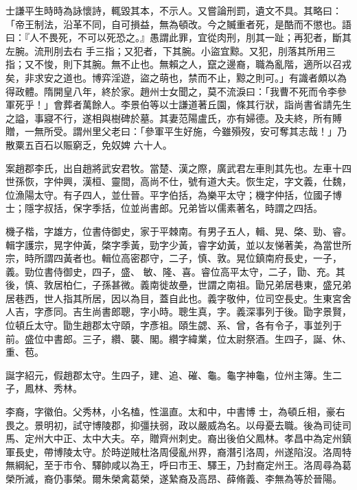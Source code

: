 \begin{pinyinscope}
 士謙平生時時為詠懷詩，輒毀其本，不示人。又嘗論刑罰，遺文不具。其略曰：「帝王制法，沿革不同，自可損益，無為頓改。今之贓重者死，是酷而不懲也。語曰：『人不畏死，不可以死恐之。』愚謂此罪，宜從肉刑，刖其一趾；再犯者，斷其左腕。流刑刖去右
 手三指；又犯者，下其腕。小盜宜黥。又犯，刖落其所用三指；又不悛，則下其腕。無不止也。無賴之人，竄之邊裔，職為亂階，適所以召戎矣，非求安之道也。博弈淫遊，盜之萌也，禁而不止，黥之則可。」有識者頗以為得政體。隋開皇八年，終於家。趙州士女聞之，莫不流淚曰：「我曹不死而令李參軍死乎！」會葬者萬餘人。李景伯等以士謙道著丘園，條其行狀，詣尚書省請先生之謚，事寢不行，遂相與樹碑於墓。其妻范陽盧氏，亦有婦德。及夫終，所有賻贈，一無所受。謂州里父老曰：「參軍平生好施，今雖殞歿，安可奪其志哉！」乃散粟五百石以賑窮乏，免奴婢
 六十人。



 案趙郡李氏，出自趙將武安君牧。當楚、漢之際，廣武君左車則其先也。左車十四世孫恢，字仲興，漢桓、靈間，高尚不仕，號有道大夫。恢生定，字文義，仕魏，位漁陽太守。有子四人，並仕晉。平字伯括，為樂平太守；機字仲括，位國子博士；隱字叔括，保字季括，位並尚書郎。兄弟皆以儒素著名，時謂之四括。



 機子楷，字雄方，位書侍御史，家于平棘南。有男子五人，輯、晃、棨、勁、睿。輯字護宗，晃字仲黃，棨字季黃，勁字少黃，睿字幼黃，並以友悌著美，為當世所宗，時所謂四黃者也。輯位高密郡守，二子，慎、敦。晃位鎮南府長史，一子，義。勁位書侍御史，四子，盛、
 敏、隆、喜。睿位高平太守，二子，勖、充。其後，慎、敦居柏仁，子孫甚微。義南徙故壘，世謂之南祖。勖兄弟居巷東，盛兄弟居巷西，世人指其所居，因以為目，蓋自此也。義字敬仲，位司空長史。生東宮舍人吉，字彥同。吉生尚書郎聰，字小時。聰生真，字。義深事列于後。勖字景賢，位頓丘太守。勖生趙郡太守頤，字彥祖。頤生勰、系、曾，各有令子，事並列于前。盛位中書郎。三子，纘、襲、閣。纘字緯業，位太尉祭酒。生四子，誕、休、重、苞。



 誕字紹元，假趙郡太守。生四子，建、追、磪、龜。龜字神龜，位州主簿。生二子，鳳林、秀林。



 李裔，字徽伯。父秀林，小名榼，性溫直。太和中，中書博
 士，為頓丘相，豪右畏之。景明初，試守博陵郡，抑彊扶弱，政以嚴威為名。以母憂去職。後為司徒司馬、定州大中正、太中大夫。卒，贈齊州刺史。裔出後伯父鳳林。孝昌中為定州鎮軍長史，帶博陵太守。於時逆賊杜洛周侵亂州界，裔潛引洛周，州遂陷沒。洛周特無綱紀，至于市令、驛帥咸以為王，呼曰市王、驛王，乃封裔定州王。洛周尋為葛榮所滅，裔仍事榮。爾朱榮禽葛榮，遂縶裔及高昂、薛脩義、李無為等於晉陽。




\end{pinyinscope}
